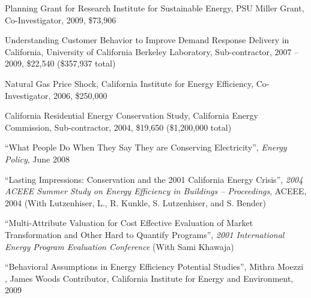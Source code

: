 \documentclass[Computer Science]{vita}
\begin{document}
\begin{vita}
\begin{Selected Grants and Sponsored Research}
\item Planning Grant for Research Institute for Sustainable Energy, PSU Miller Grant,  Co-Investigator, 2009, \$73,906

  \item Understanding Customer Behavior to Improve Demand Response Delivery in California, University of California Berkeley Laboratory, Sub-contractor, 2007 -- 2009, \$22,540 (\$357,937 total)

  \item Natural Gas Price Shock, California Institute for Energy
    Efficiency, Co-Investigator, 2006, \$250,000

  \item California Residential Energy Conservation Study, California Energy Commission, Sub-contractor, 2004, \$19,650 (\$1,200,000 total)

  \end{Selected Grants and Sponsored Research}

  \begin{Selected Publications}


    \begin{Papers in Refereed Journals}
    \item ``What People Do When They Say They are Conserving Electricity'', \emph{Energy Policy}, June 2008


    \end{Papers in Refereed Journals}

    \begin{Papers at Refereed Conferences}

    \item ``Lasting Impressions: Conservation and the 2001 California
      Energy Crisis'', \emph{2004 ACEEE Summer Study on Energy
        Efficiency in Buildings -- Proceedings}, ACEEE, 2004 (With
      Lutzenhiser, L., R. Kunkle, S. Lutzenhiser, and S. Bender)
	
    \item ``Multi-Attribute Valuation for Cost Effective Evaluation of
      Market Transformation and Other Hard to Quantify Programs'',
      \emph{2001 International Energy Program Evaluation Conference}
      (With Sami Khawaja)
	

    \end{Papers at Refereed Conferences}
   
    \begin{Unrefereed Public Reports}
    
    
    \item ``Behavioral Assumptions in Energy Efficiency Potential
      Studies'', Mithra Moezzi , James Woods Contributor, California
      Institute for Energy and Environment, 2009


\end{Unrefereed Public Reports}
\end{Selected Publications}
\end{vita}
\end{document}

